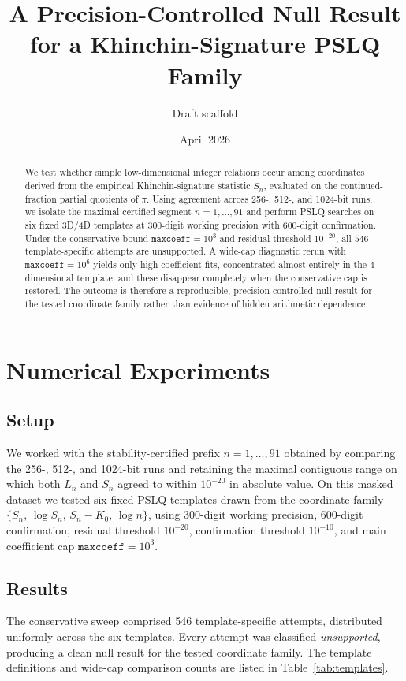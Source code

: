 \documentclass[11pt]{article}
\title{A Precision-Controlled Null Result for a Khinchin-Signature PSLQ Family}
\author{Draft scaffold}
\date{April 2026}
\begin{document}
\maketitle

\begin{abstract}
We test whether simple low-dimensional integer relations occur among coordinates derived from the empirical Khinchin-signature statistic $S_n$, evaluated on the continued-fraction partial quotients of $\pi$. Using agreement across 256-, 512-, and 1024-bit runs, we isolate the maximal certified segment $n=1,\ldots,91$ and perform PSLQ searches on six fixed 3D/4D templates at 300-digit working precision with 600-digit confirmation. Under the conservative bound $\texttt{maxcoeff}=10^3$ and residual threshold $10^{-20}$, all $546$ template-specific attempts are unsupported. A wide-cap diagnostic rerun with $\texttt{maxcoeff}=10^6$ yields only high-coefficient fits, concentrated almost entirely in the 4-dimensional template, and these disappear completely when the conservative cap is restored. The outcome is therefore a reproducible, precision-controlled null result for the tested coordinate family rather than evidence of hidden arithmetic dependence.
\end{abstract}

\section{Numerical Experiments}\label{sec:numerics}

\subsection{Setup}
We worked with the stability-certified prefix $n=1,\ldots,91$ obtained by comparing the 256-, 512-, and 1024-bit runs and retaining the maximal contiguous range on which both $L_n$ and $S_n$ agreed to within $10^{-20}$ in absolute value. On this masked dataset we tested six fixed PSLQ templates drawn from the coordinate family $\{S_n,\, \log S_n,\, S_n-K_0,\, \log n\}$, using 300-digit working precision, 600-digit confirmation, residual threshold $10^{-20}$, confirmation threshold $10^{-10}$, and main coefficient cap $\texttt{maxcoeff}=10^3$.

\subsection{Results}
The conservative sweep comprised 546 template-specific attempts, distributed uniformly across the six templates. Every attempt was classified \emph{unsupported}, producing a clean null result for the tested coordinate family. The template definitions and wide-cap comparison counts are listed in Table~\ref{tab:templates}.
\end{document}
